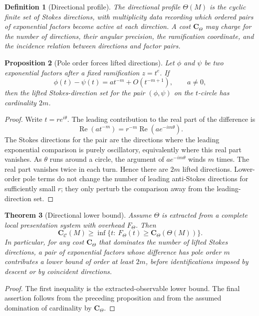 \documentclass[11pt]{article}
\newtheorem{theorem}{Theorem}[section]
\newtheorem{proposition}[theorem]{Proposition}
\newtheorem{definition}[theorem]{Definition}
\begin{document}
\begin{definition}[Directional profile]
The directional profile \(\Theta(M)\) is the cyclic finite set of Stokes directions, with multiplicity data recording which ordered pairs of exponential factors become active at each direction.  A cost \(\mathbf C_{\Theta}\) may charge for the number of directions, their angular precision, the ramification coordinate, and the incidence relation between directions and factor pairs.
\end{definition}

\begin{proposition}[Pole order forces lifted directions]
Let \(\phi\) and \(\psi\) be two exponential factors after a fixed ramification \(z=t^e\).  If
\[
\phi(t)-\psi(t)=a t^{-m}+O(t^{-m+1}),\qquad a\ne0,
\]
then the lifted Stokes-direction set for the pair \((\phi,\psi)\) on the \(t\)-circle has cardinality \(2m\).
\end{proposition}

\begin{proof}
Write \(t=re^{i\theta}\).  The leading contribution to the real part of the difference is
\[
\operatorname{Re}(a t^{-m})
=
r^{-m}\operatorname{Re}(a e^{-im\theta}).
\]
The Stokes directions for the pair are the directions where the leading exponential comparison is purely oscillatory, equivalently where this real part vanishes.  As \(\theta\) runs around a circle, the argument of \(a e^{-im\theta}\) winds \(m\) times.  The real part vanishes twice in each turn.  Hence there are \(2m\) lifted directions.  Lower-order pole terms do not change the number of leading anti-Stokes directions for sufficiently small \(r\); they only perturb the comparison away from the leading-direction set.
\end{proof}

\begin{theorem}[Directional lower bound]
Assume \(\Theta\) is extracted from a complete local presentation system with overhead \(F_{\Theta}\).  Then
\[
\mathbf C_{\mathcal C}(M)
\ge
\inf\{t:\ F_{\Theta}(t)\ge \mathbf C_{\Theta}(\Theta(M))\}.
\]
In particular, for any cost \(\mathbf C_{\Theta}\) that dominates the number of lifted Stokes directions, a pair of exponential factors whose difference has pole order \(m\) contributes a lower bound of order at least \(2m\), before identifications imposed by descent or by coincident directions.
\end{theorem}

\begin{proof}
The first inequality is the extracted-observable lower bound.  The final assertion follows from the preceding proposition and from the assumed domination of cardinality by \(\mathbf C_{\Theta}\).
\end{proof}
\end{document}
